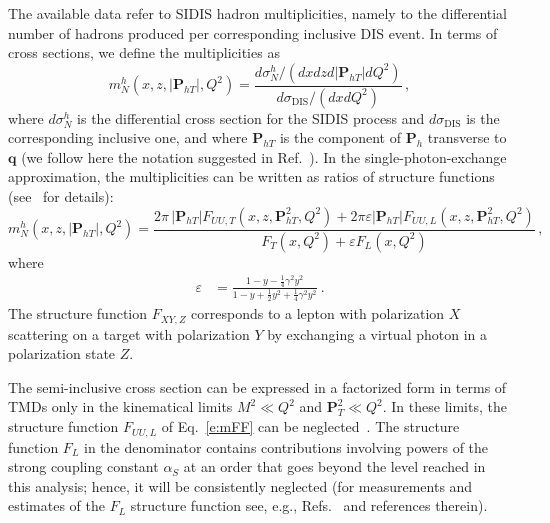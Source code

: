 \documentclass[aps,preprintnumbers,showpacs,nofootinbib,superscriptaddress,floatfix]{revtex4}
\newcommand{\Tperp}{T}
\begin{document}
The available data refer to SIDIS hadron multiplicities, namely to the differential number of hadrons produced per corresponding inclusive DIS event. In terms of cross sections, we define the multiplicities as
\begin{equation}
m_N^h (x,z,|\bm{P}_{h\Tperp}|, Q^2) = \frac{d \sigma_N^h / ( dx  dz d|\bm{P}_{h\Tperp}| dQ^2) }
                                                                   {d\sigma_{\text{DIS}} / ( dx dQ^2 ) }\, ,
\label{e:multiplicity}
\end{equation}
where $d\sigma_N^h$ is the differential cross section for the SIDIS process and $d\sigma_{\text{DIS}}$ is the corresponding inclusive one, 
and where \( \bm{P}_{h\Tperp} \) is the component of \( \bm{P}_{h} \)
transverse to \( \bm{q} \) (we follow here the notation suggested in
Ref.~\cite{Boer:2011fh}).  
In the single-photon-exchange approximation, the multiplicities can be written
as ratios of 
structure functions (see~\cite{Bacchetta:2006tn} for details):
\begin{equation}
m_N^h (x,z,|\bm{P}_{h\Tperp}|, Q^2) =   
\frac{2 \pi\,|\bm{P}_{h\Tperp}| F_{UU ,T}(x,z,\bm{P}_{h\Tperp}^2, Q^2) + 2 \pi
  \varepsilon |\bm{P}_{h\Tperp}| F_{UU ,L}(x,z,\bm{P}_{h\Tperp}^2, Q^2)}
        {F_{T}(x,Q^2) + \varepsilon  F_{L}(x,Q^2)} \, ,
 \label{e:mFF}
\end{equation} 
where
\begin{align}
\varepsilon &= \frac{1-y -\frac{1}{4} \gamma^2 y^2}{1-y+\frac{1}{2} y^2 +\frac{1}{4} \gamma^2 y^2} \ .
\end{align}  
The structure function $F_{XY,Z}$ corresponds to a lepton with polarization $X$ scattering on a target with polarization $Y$ by exchanging a virtual photon in a polarization state $Z$.

The semi-inclusive cross section can be expressed in a factorized form in
terms of TMDs only in the kinematical limits $M^2 \ll Q^2$ and $\bm{P}_T^2 \ll
Q^2$. In these limits, the structure function $F_{UU,L}$ of Eq.~\eqref{e:mFF}
can be neglected~\cite{Bacchetta:2008xw}. 
 The structure function $F_L$ in the denominator contains contributions
 involving powers of the strong coupling constant $\alpha_S$ at an order that
 goes beyond the level reached in this analysis; 
hence, it will be
 consistently neglected (for measurements and
 estimates of the $F_L$ structure function see, e.g.,
 Refs.~\cite{Chekanov:2009na,Andreev:2013vha} and references therein).  
\end{document}
